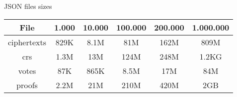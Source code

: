 \documentclass{standalone}
\begin{document}
\begin{threeparttable}
\caption{JSON files sizes}
\label{table:files}
\begin{tabular}{ |c||c|c|c|c|c| }
\hline
\textbf{File} & \textbf{1.000} & \textbf{10.000} & \textbf{100.000} & \textbf{200.000} & \textbf{1.000.000} \\
\hline
ciphertexts & 829K & 8.1M & 81M & 162M & 809M \\
crs & 1.3M & 13M & 124M & 248M & 1.2KG \\
votes & 87K & 865K & 8.5M & 17M & 84M \\
proofs & 2.2M & 21M & 210M & 420M & 2GB \\
\hline
\end{tabular}
\begin{tablenotes}
\small
\item
\end{tablenotes}
\end{threeparttable}
\end{document}
